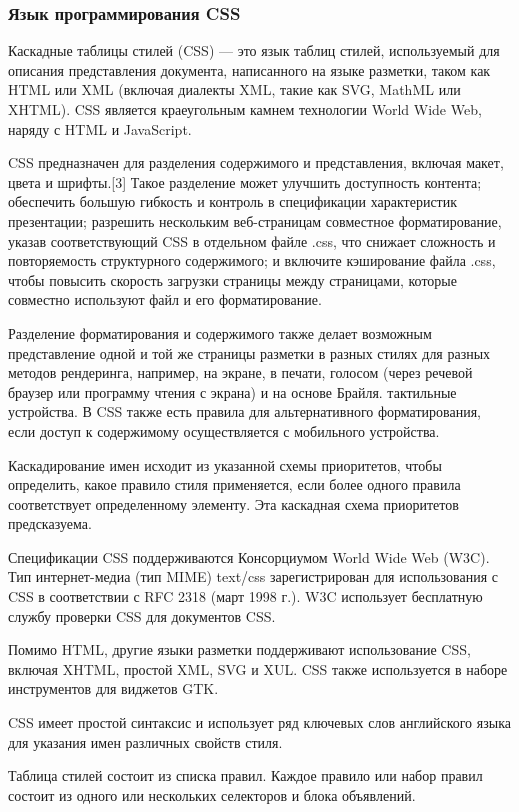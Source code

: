 \subsubsection{Язык программирования CSS}

Каскадные таблицы стилей (CSS) — это язык таблиц стилей, используемый для описания представления документа, написанного на языке разметки, таком как HTML или XML (включая диалекты XML, такие как SVG, MathML или XHTML). CSS является краеугольным камнем технологии World Wide Web, наряду с HTML и JavaScript.

CSS предназначен для разделения содержимого и представления, включая макет, цвета и шрифты.[3] Такое разделение может улучшить доступность контента; обеспечить большую гибкость и контроль в спецификации характеристик презентации; разрешить нескольким веб-страницам совместное форматирование, указав соответствующий CSS в отдельном файле .css, что снижает сложность и повторяемость структурного содержимого; и включите кэширование файла .css, чтобы повысить скорость загрузки страницы между страницами, которые совместно используют файл и его форматирование.

Разделение форматирования и содержимого также делает возможным представление одной и той же страницы разметки в разных стилях для разных методов рендеринга, например, на экране, в печати, голосом (через речевой браузер или программу чтения с экрана) и на основе Брайля. тактильные устройства. В CSS также есть правила для альтернативного форматирования, если доступ к содержимому осуществляется с мобильного устройства.

Каскадирование имен исходит из указанной схемы приоритетов, чтобы определить, какое правило стиля применяется, если более одного правила соответствует определенному элементу. Эта каскадная схема приоритетов предсказуема.

Спецификации CSS поддерживаются Консорциумом World Wide Web (W3C). Тип интернет-медиа (тип MIME) text/css зарегистрирован для использования с CSS в соответствии с RFC 2318 (март 1998 г.). W3C использует бесплатную службу проверки CSS для документов CSS.

Помимо HTML, другие языки разметки поддерживают использование CSS, включая XHTML, простой XML, SVG и XUL. CSS также используется в наборе инструментов для виджетов GTK.

CSS имеет простой синтаксис и использует ряд ключевых слов английского языка для указания имен различных свойств стиля.

Таблица стилей состоит из списка правил. Каждое правило или набор правил состоит из одного или нескольких селекторов и блока объявлений.

